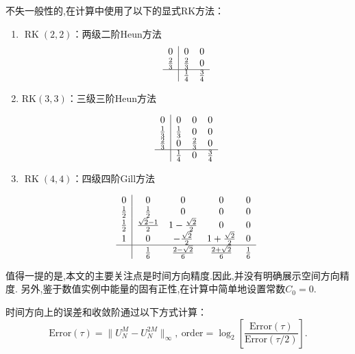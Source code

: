 不失一般性的,在计算中使用了以下的显式RK方法\cite{shuEfficientImplementationEssentially1988}：
\begin{enumerate}
\item $\operatorname{RK}(2,2)$：两级二阶Heun方法%
\begin{equation}
\begin{array}{c|cc}
0 & 0 & 0 \\
\frac{2}{3} & \frac{2}{3} & 0 \\
\hline & \frac{1}{4} & \frac{3}{4}
\end{array}
\end{equation}
	
\item $\mathrm{RK}(3,3)$：三级三阶Heun方法%
	
\begin{equation}
\begin{array}{c|ccc}
0 & 0 & 0 & 0 \\
\frac{1}{3} & \frac{1}{3} & 0 & 0 \\
\frac{2}{3} & 0 & \frac{2}{3} & 0 \\
\hline & \frac{1}{4} & 0 & \frac{3}{4}
\end{array}
\end{equation}
		
\item $\operatorname{RK}(4,4)$：四级四阶Gill方法%
		
\begin{equation}
\begin{array}{c|cccc}
0 & 0 & 0 & 0 & 0 \\
\frac{1}{2} & \frac{1}{2} & 0 & 0 & 0 \\
\frac{1}{2} & \frac{\sqrt{2}-1}{2} & 1-\frac{\sqrt{2}}{2} & 0 & 0 \\
1 & 0 & -\frac{\sqrt{2}}{2} & 1+\frac{\sqrt{2}}{2} & 0 \\
\hline & \frac{1}{6} & \frac{2-\sqrt{2}}{6} & \frac{2+\sqrt{2}}{6} & \frac{1}{6}
\end{array}
\end{equation}
\end{enumerate}

值得一提的是,本文的主要关注点是时间方向精度.因此,并没有明确展示空间方向精度.
另外,鉴于数值实例中能量的固有正性,在计算中简单地设置常数$C_0=0$.

时间方向上的误差和收敛阶通过以下方式计算：
\begin{equation}
	\text{Error}(\tau) = \|U_{N}^{M} - U_{N}^{2 M}\|_{\infty},~\text{order} = \log_{2}\left[\frac{\text{Error}(\tau)}{\text{Error}(\tau / 2)}\right].\label{eq_SAVRRK:104}
\end{equation}


